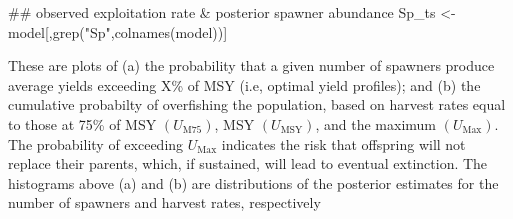 \documentclass[
  11pt,
]{article}
\newenvironment{Shaded}{}{}
\newcommand{\CommentTok}[1]{\textcolor[rgb]{0.00,0.50,0.00}{#1}}
\newcommand{\KeywordTok}[1]{\textcolor[rgb]{0.00,0.00,1.00}{#1}}
\newcommand{\NormalTok}[1]{#1}
\newcommand{\StringTok}[1]{\textcolor[rgb]{0.00,0.50,0.50}{#1}}
\begin{document}
\begin{Shaded}
\begin{Highlighting}[]
\CommentTok{## observed exploitation rate & posterior spawner abundance}
\NormalTok{Sp_ts <-}\StringTok{ }\NormalTok{model[,}\KeywordTok{grep}\NormalTok{(}\StringTok{"Sp"}\NormalTok{,}\KeywordTok{colnames}\NormalTok{(model))]}
\end{Highlighting}
\end{Shaded}

These are plots of (a) the probability that a given number of spawners
produce average yields exceeding X\% of MSY (i.e, optimal yield
profiles); and (b) the cumulative probabilty of overfishing the
population, based on harvest rates equal to those at 75\% of MSY
\((U_{\text{M75}})\), MSY \((U_{\text{MSY}})\), and the maximum
\((U_{\text{Max}})\). The probability of exceeding \(U_{\text{Max}}\)
indicates the risk that offspring will not replace their parents, which,
if sustained, will lead to eventual extinction. The histograms above (a)
and (b) are distributions of the posterior estimates for the number of
spawners and harvest rates, respectively
\end{document}
